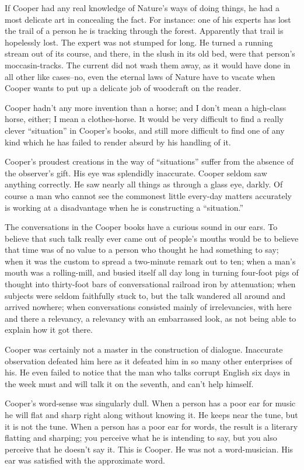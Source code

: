 \documentclass[../interior-demo.tex]{subfiles}
\begin{document}
If Cooper had any real knowledge of Nature's ways of doing
things, he had a most delicate art in concealing the fact. For instance:
one of his experts has lost the trail of a person he is tracking through the
forest. Apparently that trail is hopelessly lost. The expert was not stumped
for long. He turned a running
stream out of its course, and there, in the slush in its old bed, were
that person's moccasin-tracks. The current did not wash them away, as
it would have done in all other like cases--no, even the eternal laws
of Nature have to vacate when Cooper wants to put up a delicate job of
woodcraft on the reader.

Cooper hadn't any more invention than a horse; and I don't mean a
high-class horse, either; I mean a clothes-horse. It would be very
difficult to find a really clever ``situation'' in Cooper's books, and
still more difficult to find one of any kind which he has failed to
render absurd by his handling of it.

Cooper's proudest creations in the way of ``situations'' suffer
from the absence of the observer's gift. His eye was
splendidly inaccurate. Cooper seldom saw anything correctly. He saw
nearly all things as through a glass eye, darkly. Of course a man who
cannot see the commonest little every-day matters accurately is
working at a disadvantage when he is constructing a ``situation.''

The conversations in the Cooper books have a curious sound in our
ears. To believe that such talk really ever came out of people's mouths
would be to believe that time was of no value to
a person who thought he had something to say; when it was the custom
to spread a two-minute remark out to ten; when a man's mouth was a
rolling-mill, and busied itself all day long in turning four-foot pigs
of thought into thirty-foot bars of conversational railroad iron by
attenuation; when subjects were seldom faithfully stuck to, but the talk
wandered all around and arrived nowhere; when conversations consisted
mainly of irrelevancies, with here and there a relevancy, a relevancy
with an embarrassed look, as not being able to explain how it got there.

Cooper was certainly not a master in the construction of dialogue.
Inaccurate observation defeated him here as it defeated him in so many
other enterprises of his. He even failed to notice that the man who
talks corrupt English six days in the week must and will talk it on
the seventh, and can't help himself.

Cooper's word-sense was singularly dull. When a person has a poor ear
for music he will flat and sharp right along without knowing it. He
keeps near the tune, but it is not the tune. When a person has a poor
ear for words, the result is a literary flatting and sharping; you
perceive what he is intending to say, but you also perceive that he
doesn't say it. This is Cooper. He was not a word-musician. His ear was
satisfied with the approximate word.
\end{document}

